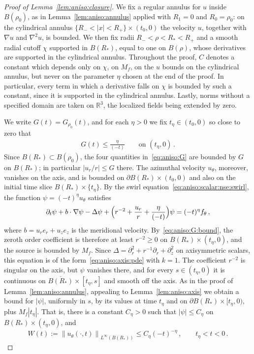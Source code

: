 \documentclass[11pt,reqno]{amsproc}
\numberwithin{equation}{section}
\theoremstyle{remark}
\newcommand{\p}{\partial}
\newcommand{\RR}{\mathbb R}
\newcommand{\norm}[1]{\left\|#1\right\|}
\begin{document}
\begin{proof}[Proof of Lemma~\ref{lem:aniso:closure}]
We fix a regular annulus for $u$ inside $B(\rho_0)$, as in Lemma~\ref{lem:aniso:annulus} applied with $R_1=0$ and $R_0=\rho_0$: on the cylindrical annulus $\{R_-<|x|<R_+\}\times(t_0,0)$ the velocity $u$, together with $\nabla u$ and $\nabla^2u$, is bounded. We then fix radii $R_-<\rho<R_*<R_+$ and a smooth radial cutoff $\chi$ supported in $B(R_*)$, equal to one on $B(\rho)$, whose derivatives are supported in the cylindrical annulus. Throughout the proof, $C$ denotes a constant which depends only on $\chi$, on $M_f$, on the $u$ bounds on the cylindrical annulus, but never on the parameter $\eta$ chosen at the end of the proof. In particular, every term in which a derivative falls on $\chi$ is bounded by such a constant, since it is supported in the cylindrical annulus. Lastly, norms without a specified domain are taken on $\RR^3$, the localized fields being extended by zero.

We write $G(t)=G_{\rho_0}(t)$, and for each $\eta>0$ we fix $t_\eta\in(t_0,0)$ so close to zero that
\begin{align}
G(t)\le\frac{\eta}{(-t)}
\qquad\mbox{on }(t_\eta,0)
\,.
\label{eq:aniso:G:bound}
\end{align}
Since $B(R_*)\subset B(\rho_0)$, the four quantities in~\eqref{eq:aniso:G} are bounded by $G$ on $B(R_*)$; in particular $|u_r/r|\le G$ there. The azimuthal velocity $u_\theta$, moreover, vanishes on the axis, and is bounded on $\partial B(R_*)\times(t_0,0)$ and also on the initial time slice $B(R_*)\times\{t_\eta\}$. By the swirl equation~\eqref{eq:aniso:scalar:nse:swirl}, the function $\psi=(-t)^\eta u_\theta$ satisfies
\[
\p_t\psi+b\cdot\nabla\psi-\Delta\psi
+\Bigl(r^{-2}+\frac{u_r}{r}+\frac{\eta}{(-t)}\Bigr)\psi
=(-t)^\eta f_\theta
\,,
\]
where $b=u_re_r+u_ze_z$ is the meridional velocity. By~\eqref{eq:aniso:G:bound}, the zeroth order coefficient is therefore at least $r^{-2}\ge0$ on $B(R_*)\times(t_\eta,0)$, and the source is bounded by $M_f$. Since $\Delta=\p_r^2+r^{-1}\p_r+\p_z^2$ on axisymmetric scalars, this equation is of the form~\eqref{eq:aniso:axis:pde} with $k=1$. The coefficient $r^{-2}$ is singular on the axis, but $\psi$ vanishes there, and for every $s\in(t_\eta,0)$ it is continuous on $\overline{B(R_*)}\times[t_\eta,s]$ and smooth off the axis. As in the proof of Lemma~\ref{lem:aniso:annulus}, appealing to Lemma~\ref{lem:aniso:axis} we obtain a bound for $|\psi|$, uniformly in $s$, by its values at time $t_\eta$ and on $\partial B(R_*)\times[t_\eta,0)$, plus $M_f|t_\eta|$. That is, there is a constant $C_\eta>0$ such that $|\psi|\le C_\eta$ on $B(R_*)\times(t_\eta,0)$, and 
\begin{align}
W(t):=\norm{u_\theta(\cdot,t)}_{L^\infty(B(R_*))}
\le C_\eta(-t)^{-\eta}
\,,\qquad t_\eta<t<0
\,.
\label{eq:aniso:closure:w}
\end{align}


\end{proof}
\end{document}
